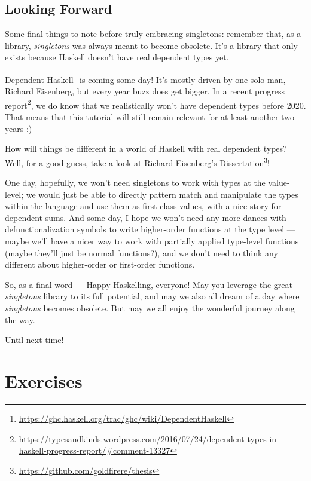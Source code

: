 \documentclass[]{article}
\renewcommand{\href}[2]{#2\footnote{\url{#1}}}
\begin{document}
\hypertarget{looking-forward}{%
\subsection{Looking Forward}\label{looking-forward}}

Some final things to note before truly embracing singletons: remember that, as a
library, \emph{singletons} was always meant to become obsolete. It's a library
that only exists because Haskell doesn't have real dependent types yet.

\href{https://ghc.haskell.org/trac/ghc/wiki/DependentHaskell}{Dependent Haskell}
is coming some day! It's mostly driven by one solo man, Richard Eisenberg, but
every year buzz does get bigger. In a
\href{https://typesandkinds.wordpress.com/2016/07/24/dependent-types-in-haskell-progress-report/\#comment-13327}{recent
progress report}, we do know that we realistically won't have dependent types
before 2020. That means that this tutorial will still remain relevant for at
least another two years :)

How will things be different in a world of Haskell with real dependent types?
Well, for a good guess, take a look at
\href{https://github.com/goldfirere/thesis}{Richard Eisenberg's Dissertation}!

One day, hopefully, we won't need singletons to work with types at the
value-level; we would just be able to directly pattern match and manipulate the
types within the language and use them as first-class values, with a nice story
for dependent sums. And some day, I hope we won't need any more dances with
defunctionalization symbols to write higher-order functions at the type level
--- maybe we'll have a nicer way to work with partially applied type-level
functions (maybe they'll just be normal functions?), and we don't need to think
any different about higher-order or first-order functions.

So, as a final word --- Happy Haskelling, everyone! May you leverage the great
\emph{singletons} library to its full potential, and may we also all dream of a
day where \emph{singletons} becomes obsolete. But may we all enjoy the wonderful
journey along the way.

Until next time!

\hypertarget{exercises}{%
\section{Exercises}\label{exercises}}
\end{document}
